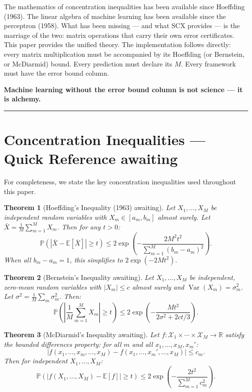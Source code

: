 \documentclass[12pt,a4paper]{article}
\newtheorem{theorem}{Theorem}[section]
\theoremstyle{definition}
\newcommand{\SCX}{\textsc{SCX}}
\DeclareMathOperator{\Var}{Var}
\newcommand{\R}{\mathbb{R}}
\newcommand{\E}{\mathbb{E}}
\newcommand{\Pbb}{\mathbb{P}}
\newcommand{\cX}{\mathcal{X}}
\newcommand{\abs}[1]{\left|#1\right|}
\begin{document}
The mathematics of concentration inequalities has been available since Hoeffding (1963).
The linear algebra of machine learning has been available since the perceptron (1958).
What has been missing — and what \SCX{} provides — is the marriage of the two: matrix 
operations that carry their own error certificates. This paper provides the unified 
theory. The implementation follows directly: every matrix multiplication must be 
accompanied by its Hoeffding (or Bernstein, or McDiarmid) bound. Every prediction 
must declare its $M$. Every framework must have the error bound column.

\textbf{}
\textbf{Machine learning without the error bound column is not science — it is alchemy.}

\medskip
\noindent\rule{\textwidth}{0.4pt}

\appendix

\section{Concentration Inequalities — Quick Reference awaiting}
\label{app:concentration}

For completeness, we state the key concentration inequalities used throughout this paper.

\begin{theorem}[Hoeffding's Inequality (1963) awaiting]\label{thm:hoeffding_app}
Let $X_1, \ldots, X_M$ be independent random variables with $X_m \in [a_m, b_m]$ almost surely.
Let $\bar{X} = \frac{1}{M}\sum_{m=1}^{M} X_m$. Then for any $t > 0$:
\[
\Pbb(\abs{\bar{X} - \E[\bar{X}]} \geq t) \leq 2\exp\!\left(-\frac{2M^2 t^2}{\sum_{m=1}^{M} (b_m - a_m)^2}\right).
\]
When all $b_m - a_m = 1$, this simplifies to $2\exp(-2M t^2)$.
\end{theorem}

\begin{theorem}[Bernstein's Inequality awaiting]\label{thm:bernstein_app}
Let $X_1, \ldots, X_M$ be independent, zero-mean random variables with 
$\abs{X_m} \leq c$ almost surely and $\Var(X_m) = \sigma_m^2$. Let 
$\sigma^2 = \frac{1}{M}\sum_m \sigma_m^2$. Then:
\[
\Pbb\left(\abs{\frac{1}{M}\sum_{m=1}^{M} X_m} \geq t\right) \leq 2\exp\!\left(-\frac{M t^2}{2\sigma^2 + 2ct/3}\right).
\]
\end{theorem}

\begin{theorem}[McDiarmid's Inequality awaiting]\label{thm:mcdiarmid_app}
Let $f: \cX_1 \times \cdots \times \cX_M \to \R$ satisfy the bounded differences 
property: for all $m$ and all $x_1, \ldots, x_M, x_m'$:
\[
\abs{f(x_1, \ldots, x_m, \ldots, x_M) - f(x_1, \ldots, x_m', \ldots, x_M)} \leq c_m.
\]
Then for independent $X_1, \ldots, X_M$:
\[
\Pbb(\abs{f(X_1, \ldots, X_M) - \E[f]} \geq t) \leq 2\exp\!\left(-\frac{2t^2}{\sum_{m=1}^{M} c_m^2}\right).
\]
\end{theorem}
\end{document}
